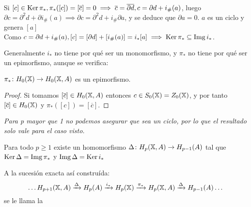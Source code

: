 Si $[c] \in \operatorname{Ker} \pi_*, \pi_*([c]) = [\overline{c}] = 0 \implies \overline{c} = \overline{\partial d}, c = \partial d + i_\#(a)$,
luego $\partial c = \partial^2 d + \partial i_\#(a) \implies \partial c = \partial^2 d + i_\# \partial a$, y se deduce que $\partial a = 0$.
$a$ es un ciclo y genera $[a]$ \\
Como $c = \partial d + i_\#(a), [c] = [\partial d] + [i_\#(a)] = i_*[a] \implies \operatorname{Ker} \pi_* \subseteq \operatorname{Img} i_*$.

Generalmente $i_*$ no tiene por qué ser un monomorfismo, y $\pi_*$ no tiene por qué ser un epimorfismo, aunque se verifica:

\begin{proposition}
  $\pi_* \colon H_0({\mathbb X}) \to H_0({\mathbb X}, A)$ es un epimorfismo.
\end{proposition}

\begin{proof}
  Si tomamos $[\overline{c}] \in H_0({\mathbb X}, A)$ entonces $c \in S_0({\mathbb X}) = Z_0({\mathbb X})$, y por tanto $[\overline{c}] \in H_0({\mathbb X})$ y
  $\pi_*([c]) = [\overline{c}]$.
\end{proof}

\textit{Para p mayor que 1 no podemos asegurar que sea un ciclo, por lo que el resultado solo vale para el caso visto.}

\begin{proposition}
  Para todo $p \geq 1$ existe un homomorfismo $\Delta \colon H_p({\mathbb X}, A) \to H_{p-1}(A)$ tal que $\operatorname{Ker} \Delta = \operatorname{Img} \pi_*$ y $\operatorname{Img} \Delta = \operatorname{Ker} i_*$

  A la sucesión exacta así construída:
  \[\dots H_{p+1}({\mathbb X}, A) \xrightarrow{\Delta} H_p(A) \xrightarrow{i_*} H_p({\mathbb X}) \xrightarrow{\pi_*} H_p({\mathbb X}, A) \xrightarrow{\Delta} H_{p-1}(A) \dots\]
  se le llama la \underline{}
\end{proposition}

